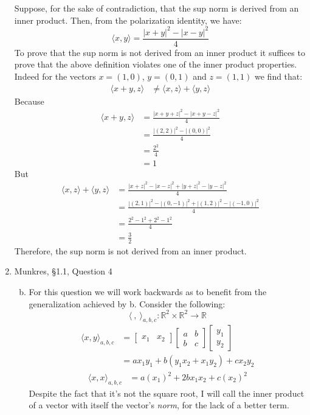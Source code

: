 \documentclass[letterpaper,10pt]{article}
\begin{document}
\begin{enumerate}
	Suppose, for the sake of contradiction, that the sup norm is derived from an inner product. Then, from the polarization identity, we have:
	$$ \langle x, y \rangle = \frac{|x+y|^2 - |x-y|^2}{4} $$
	To prove that the sup norm is not derived from an inner product it suffices to prove that the above definition violates one of the inner product properties. Indeed for the vectors $x = (1,0)$, $y = (0, 1)$ and $z = (1, 1)$ we find that:
	\begin{align*}
		\langle x + y, z \rangle & \neq \langle x, z \rangle + \langle y, z \rangle 
	\end{align*}
	Because
	\begin{align*}
		 \langle x + y, z \rangle & = \frac{|x+y+z|^2 - |x+y-z|^2}{4} \\
		 & = \frac{|(2,2)|^2 - |(0,0)|^2}{4} \\
		 & = \frac{2^2}{4} \\
		 & = 1
	\end{align*}
	But
	\begin{align*}
		 \langle x, z \rangle + \langle y, z \rangle & = \frac{|x+z|^2 - |x-z|^2 + |y+z|^2 - |y-z|^2}{4}  \\
		 & = \frac{|(2,1)|^2 - |(0,-1)|^2 + |(1,2)|^2 - |(-1,0)|^2}{4} \\
		 & = \frac{2^2 - 1^2 + 2^2 - 1^2}{4} \\
		 & = \frac{3}{2}
	\end{align*}
	Therefore, the sup norm is not derived from an inner product.

	\item Munkres, \S1.1, Question 4
	\begin{enumerate}[a)]
		\setcounter{enumii}{1}
		\item For this question we will work backwards as to benefit from the generalization achieved by b. Consider the following:
		$$ \langle \  , \   \rangle _{a,b,c} : \mathbb{R}^2 \times \mathbb{R}^2 \rightarrow \mathbb{R} $$
		\begin{align*}
		  \langle x , y \rangle _{a,b,c} & = 
			\begin{bmatrix}
				x_{1} & x_{2}
			\end{bmatrix}
			\begin{bmatrix}
				a & b \\
				b & c 
			\end{bmatrix}
			\begin{bmatrix}
				y_{1} \\
				y_{2} 
			\end{bmatrix} \\
			& = a x_{1} y_{1} + b(y_{1} x_{2} + x_{1} y_{2}) + c x_{2} y_{2}
		\end{align*}
		\begin{align*}
			\langle x, x \rangle _{a,b,c} & = a (x_{1})^2 + 2b x_{1} x_{2} + c (x_{2})^2
		\end{align*}
		Despite the fact that it's not the square root, I will call the inner product of a vector with itself the vector's \emph{norm}, for the lack of a better term.


\end{enumerate}
\end{enumerate}
\end{document}
